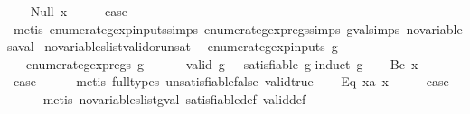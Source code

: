 \begin{isabellebody}
\isamarkupfalse%
\isanewline
\ \ \isamarkupfalse%
\ {\isacharparenleft}Null\ x{\isacharparenright}\isanewline
\ \ \isamarkupfalse%
\ \isamarkupfalse%
\ {\isacharquery}case\isanewline
\ \ \ \ \isamarkupfalse%
\ {\isacharparenleft}metis\ enumerate{\isacharunderscore}gexp{\isacharunderscore}inputs{\isachardot}simps{\isacharparenleft}{}{\isacharparenright}\ enumerate{\isacharunderscore}gexp{\isacharunderscore}regs{\isachardot}simps{\isacharparenleft}{}{\isacharparenright}\ gval{\isachardot}simps{\isacharparenleft}{}{\isacharparenright}\ no{\isacharunderscore}variables{\isacharunderscore}aval{\isacharparenright}\isanewline
{}\isamarkupfalse%
%
\endisatagproof
{\isafoldproof}%
%
\isadelimproof
\isanewline
%
\endisadelimproof
\isanewline
{}\isamarkupfalse%
\ no{\isacharunderscore}variables{\isacharunderscore}list{\isacharunderscore}valid{\isacharunderscore}or{\isacharunderscore}unsat{\isacharcolon}\isanewline
\ \ {\isachardoublequoteopen}enumerate{\isacharunderscore}gexp{\isacharunderscore}inputs\ g\ {\isacharequal}\ {\isacharbraceleft}{\isacharbraceright}\ {\isasymLongrightarrow}\isanewline
\ \ \ enumerate{\isacharunderscore}gexp{\isacharunderscore}regs\ g\ {\isacharequal}\ {\isacharbraceleft}{\isacharbraceright}\ {\isasymLongrightarrow}\isanewline
\ \ \ valid\ g\ {\isasymor}\ {\isasymnot}\ satisfiable\ g{\isachardoublequoteclose}\isanewline
%
\isadelimproof
%
\endisadelimproof
%
\isatagproof
{}\isamarkupfalse%
{\isacharparenleft}induct\ g{\isacharparenright}\isanewline
\ \ \isamarkupfalse%
\ {\isacharparenleft}Bc\ x{\isacharparenright}\isanewline
\ \ \isamarkupfalse%
\ \isamarkupfalse%
\ {\isacharquery}case\isanewline
\ \ \ \ \isamarkupfalse%
\ {\isacharparenleft}metis\ {\isacharparenleft}full{\isacharunderscore}types{\isacharparenright}\ unsatisfiable{\isacharunderscore}false\ valid{\isacharunderscore}true{\isacharparenright}\isanewline
{}\isamarkupfalse%
\isanewline
\ \ \isamarkupfalse%
\ {\isacharparenleft}Eq\ x{}a\ x{}{\isacharparenright}\isanewline
\ \ \isamarkupfalse%
\ \isamarkupfalse%
\ {\isacharquery}case\isanewline
\ \ \ \ \isamarkupfalse%
\ {\isacharparenleft}metis\ no{\isacharunderscore}variables{\isacharunderscore}list{\isacharunderscore}gval\ satisfiable{\isacharunderscore}def\ valid{\isacharunderscore}def{\isacharparenright}\isanewline

\end{isabellebody}
